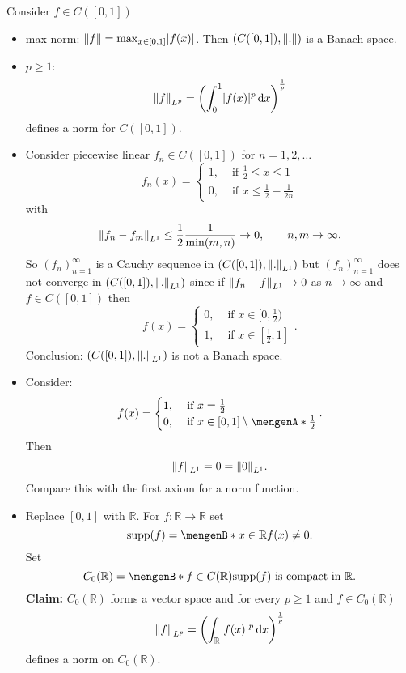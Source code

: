 Consider $ f \in C([0,1])$
\begin{itemize}
	\item max-norm: $\norm{f} = \max_{x \in [0,1]}\abs{f(x)}$. Then $(C([0,1]),\norm{.})$ is a Banach space.
	\item $p \geq 1:$
	\[
		\norm{f}_{L^p} = \left( \int_{0}^{1}\abs{f(x)}^p \,\mathrm{d}x \right)^{\frac{1}{p}} 
	\]
	defines a norm for $C([0,1])$.
\end{itemize}
\begin{bemerkung}
	\begin{itemize}
		\item Consider piecewise linear $f_n \in C([0,1])$ for $n =1,2, \dots$
		\[
			f_n(x) = \begin{cases}
				1, &\text{ if } \frac{1}{2} \leq x \leq 1 \\
				0, &\text{ if } x \leq \frac{1}{2} - \frac{1}{2n}
			\end{cases}
		\]
		with
		\[
			\norm{f_n-f_m}_{L^1} \leq \frac{1}{2} \frac{1}{\min(m,n)} \to 0, \qquad n,m \to \infty.
		\]
		So $(f_n)_{n=1}^{\infty}$ is a Cauchy sequence in $(C([0,1]),\norm{.}_{L^1})$ but $(f_n)_{n=1}^{\infty}$ does not converge in $(C([0,1]),\norm{.}_{L^1})$ since
		if $\norm{f_n - f}_{L^1} \to 0$ as $n \to \infty$ and $f \in C([0,1])$ then
		\[
			f(x) = \begin{cases}
				0, &\text{ if }x \in [0,\frac{1}{2})\\
				1, &\text{ if }x \in [\frac{1}{2},1]
			\end{cases}.
		\]
		Conclusion: $(C([0,1]), \norm{.}_{L^1})$ is not a Banach space.
		\item Consider:
		\[
			f(x) = \begin{cases}
				1, &\text{ if }x = \frac{1}{2}\\
				0, &\text{ if }x \in [0,1] \setminus \set{\frac{1}{2}}
			\end{cases}.
		\]
		Then
		\[
			\norm{f}_{L^1} = 0 = \norm{0}_{L^1}.
		\]
		Compare this with the first axiom for a norm function.
		\item Replace $[0,1]$ with $\mathbb{R}$. For $f : \mathbb{R} \to \mathbb{R}$ set \[
			\supp(f) = \set[x \in \mathbb{R}]{f(x) \neq 0}.
		\]
		Set 
		\[
			C_0(\mathbb{R}) = \set[f \in C(\mathbb{R})]{ \supp(f) \text{ is compact in }\mathbb{R}}.
		\]
		\textbf{Claim:} \text{    }      $C_0(\mathbb{R})$ forms a vector space and for every $p \geq 1$ and $f \in C_0(\mathbb{R})$
		\[
			\norm{f}_{L^p} = \left( \int_{\mathbb{R}}^{} \abs{f(x)}^p \,\mathrm{d}x \right)^{\frac{1}{p}}
		\] defines a norm on $C_0(\mathbb{R})$. \\

\end{itemize}
\end{bemerkung}
